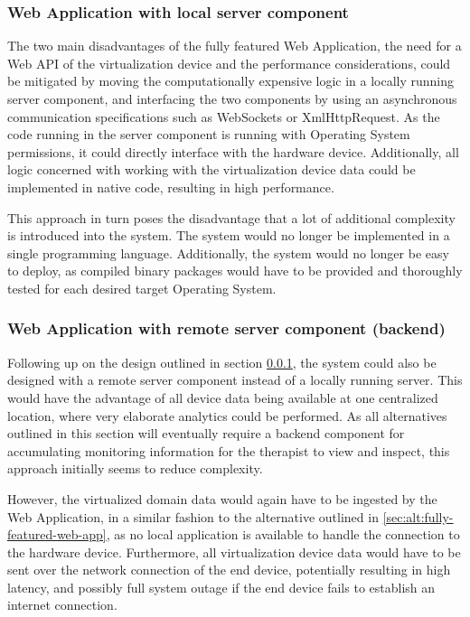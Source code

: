 \subsubsection{Web Application with local server component}
\label{sec:alt:thin-web-app}
The two main disadvantages of the fully featured Web Application, the need for a Web API of the virtualization device and the performance considerations, could be mitigated by moving the computationally expensive logic in a locally running server component, and interfacing the two components by using an asynchronous communication specifications such as WebSockets or XmlHttpRequest. As the code running in the server component is running with Operating System permissions, it could directly interface with the hardware device. Additionally, all logic concerned with working with the virtualization device data could be implemented in native code, resulting in high performance.

This approach in turn poses the disadvantage that a lot of additional complexity is introduced into the system. The system would no longer be implemented in a single programming language. Additionally, the system would no longer be easy to deploy, as compiled binary packages would have to be provided and thoroughly tested for each desired target Operating System.
\subsubsection{Web Application with remote server component (backend)}
\label{sec:alt:thin-remote-web-app}
Following up on the design outlined in section \ref{sec:alt:thin-web-app}, the system could also be designed with a remote server component instead of a locally running server. This would have the advantage of all device data being available
at one centralized location, where very elaborate analytics could be performed. As all alternatives outlined in this section will eventually require a backend component for accumulating monitoring information for the therapist to view and inspect, this approach initially seems to reduce complexity.

However, the virtualized domain data would again have to be ingested by the Web Application, in a similar fashion to the alternative outlined in \ref{sec:alt:fully-featured-web-app}, as no local application is available to handle the connection to the hardware device. Furthermore, all virtualization device data would have to be sent over the network connection of the end device, potentially resulting in high latency, and possibly full system outage if the end device fails to establish an internet connection.
